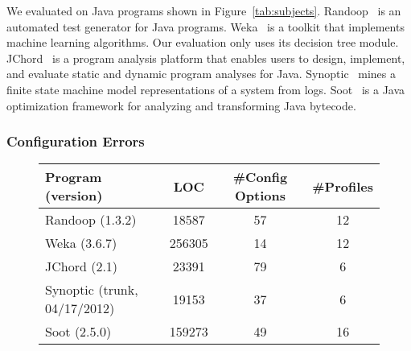 
We evaluated \ourtool on \subjectnum Java programs shown
in Figure~\ref{tab:subjects}.
Randoop~\cite{PachecoLET2007} is an automated test generator
for Java programs. Weka~\cite{wekaarticle} is a toolkit that implements
machine learning algorithms. Our evaluation
only uses its decision tree module. JChord~\cite{chordtutorial}
is a program analysis platform that enables users to design, implement,
and evaluate static and dynamic program analyses for Java.
Synoptic~\cite{Beschastnikh:2011} mines a finite state machine
model representations of a system from logs.
Soot~\cite{Vallee-Rai-1999} is a Java optimization framework for analyzing and transforming Java bytecode.


\subsubsection{Configuration Errors}



\begin{figure}[t]
\centering
\small{
\setlength{\tabcolsep}{.64\tabcolsep}
\begin{tabular}{|l|c|c|c|}
\hline
 Program (version) & LOC & \#Config Options & \#Profiles\\
 \hline
 \hline
 Randoop (1.3.2) & 18587 & 57 & 12\\
 Weka (3.6.7) & 256305 & 14 & 12\\
 JChord (2.1) & 23391 &  79 & 6 \\
 Synoptic (trunk, 04/17/2012) & 19153 & 37 & 6\\
 Soot (2.5.0) & 159273 & 49 & 16 \\
\hline
\end{tabular}
}

\end{figure}


